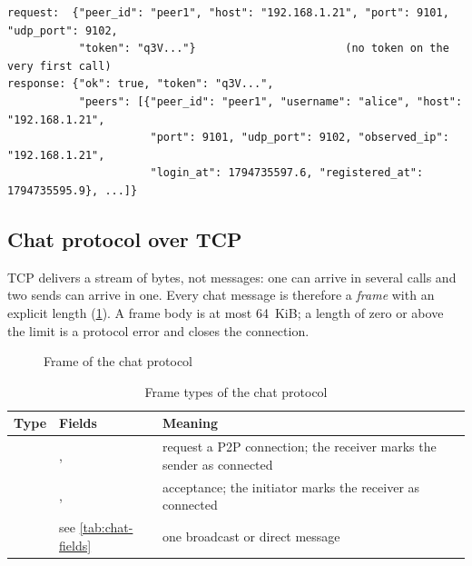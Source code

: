 \begin{lstlisting}[style=json, caption={Registration and heartbeat (\code{POST /submit-info})}, label={lst:submit}]
request:  {"peer_id": "peer1", "host": "192.168.1.21", "port": 9101, "udp_port": 9102,
           "token": "q3V..."}                       (no token on the very first call)
response: {"ok": true, "token": "q3V...",
           "peers": [{"peer_id": "peer1", "username": "alice", "host": "192.168.1.21",
                      "port": 9101, "udp_port": 9102, "observed_ip": "192.168.1.21",
                      "login_at": 1794735597.6, "registered_at": 1794735595.9}, ...]}
\end{lstlisting}

\subsection{Chat protocol over TCP}\label{sec:chat-protocol}
TCP delivers a stream of bytes, not messages: one  can arrive in several  calls
and two sends can arrive in one. Every chat message is therefore a \emph{frame} with an explicit
length (\cref{fig:frame}). A frame body is at most \SI{64}{KiB}; a length of zero or above the limit
is a protocol error and closes the connection.

\begin{figure}[H]\centering
{}
\caption{Frame of the chat protocol}\label{fig:frame}
\end{figure}

\begin{table}[H]\centering\footnotesize
\caption{Frame types of the chat protocol}\label{tab:frames}
\begin{tabularx}{\textwidth}{@{}l l Y@{}}
\toprule
\textbf{Type} & \textbf{Fields} & \textbf{Meaning} \\
\midrule
{} & ,  & request a P2P connection; the receiver marks the sender as connected \\
 & ,  & acceptance; the initiator marks the receiver as connected \\
 & see \cref{tab:chat-fields} & one broadcast or direct message \\
\bottomrule
\end{tabularx}
\end{table}

